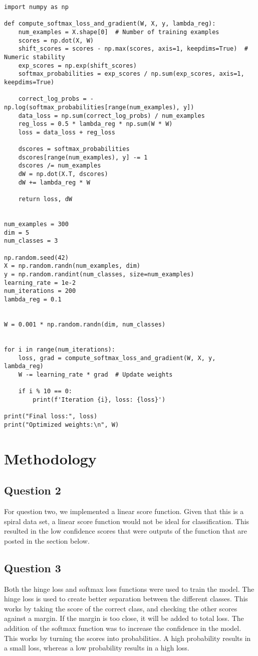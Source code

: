 \documentclass{article}
\begin{document}
\begin{lstlisting}
import numpy as np

def compute_softmax_loss_and_gradient(W, X, y, lambda_reg):
    num_examples = X.shape[0]  # Number of training examples
    scores = np.dot(X, W)
    shift_scores = scores - np.max(scores, axis=1, keepdims=True)  # Numeric stability
    exp_scores = np.exp(shift_scores)
    softmax_probabilities = exp_scores / np.sum(exp_scores, axis=1, keepdims=True)
    
    correct_log_probs = -np.log(softmax_probabilities[range(num_examples), y])
    data_loss = np.sum(correct_log_probs) / num_examples
    reg_loss = 0.5 * lambda_reg * np.sum(W * W)
    loss = data_loss + reg_loss
    
    dscores = softmax_probabilities
    dscores[range(num_examples), y] -= 1
    dscores /= num_examples
    dW = np.dot(X.T, dscores)
    dW += lambda_reg * W 
    
    return loss, dW


num_examples = 300  
dim = 5  
num_classes = 3  

np.random.seed(42)
X = np.random.randn(num_examples, dim)  
y = np.random.randint(num_classes, size=num_examples)  
learning_rate = 1e-2
num_iterations = 200
lambda_reg = 0.1


W = 0.001 * np.random.randn(dim, num_classes)


for i in range(num_iterations):
    loss, grad = compute_softmax_loss_and_gradient(W, X, y, lambda_reg)
    W -= learning_rate * grad  # Update weights
    
    if i % 10 == 0:
        print(f'Iteration {i}, loss: {loss}')

print("Final loss:", loss)
print("Optimized weights:\n", W)
\end{lstlisting}

\section{Methodology}
\subsection{Question 2}For question two, we implemented a linear score function. Given that this is a spiral data set, a linear score function would not be ideal for classification. This resulted in the low confidence scores that were outputs of the function that are posted in the section below. 

\subsection{Question 3} Both the hinge loss and softmax loss functions were used to train the model. The hinge loss is used to create better separation between the different classes. This works by taking the score of  the correct class, and checking the other scores against a margin. If the margin is too close, it will be added to total loss. 
The addition of the softmax function was to increase the confidence in the model. This works by turning the scores into probabilities. A high probability results in a small loss, whereas a low probability results in a high loss.
\end{document}
